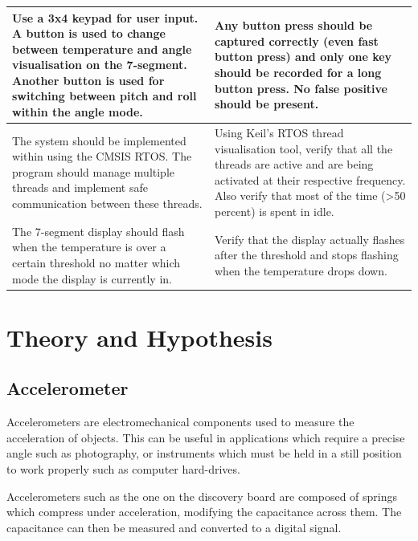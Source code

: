 ﻿\documentclass[12pt]{article}
\begin{document}
\begin{table}[!h]
\begin{tabular}{|p{0.5\linewidth}|p{0.5\linewidth}|}
Use a 3x4 keypad for user input. A button is used to change between temperature and angle visualisation on the 7-segment. Another button is used for switching between pitch and roll within the angle mode.                                  & Any button press should be captured correctly (even fast button press) and only one key should be recorded for a long button press. No false positive should be present.                                                 \\ \hline
The system should be implemented within using the CMSIS RTOS. The program should manage multiple threads and implement safe communication between these threads.                                                                              & Using Keil's RTOS thread visualisation tool, verify that all the threads are active and are being activated at their respective frequency. Also verify that most of the time (\textgreater 50 percent) is spent in idle. \\ \hline
The 7-segment display should flash when the temperature is over a certain threshold no matter which mode the display is currently in.                                                                                                         & Verify that the display actually flashes after the threshold and stops flashing when the temperature drops down.                                                                                                         \\ \hline
\end{tabular}
\end{table}


\section{Theory and Hypothesis}
\subsection{Accelerometer}
Accelerometers are electromechanical components used to measure the acceleration of objects. This can be useful in applications which require a precise angle such as photography, or instruments which must be held in a still position to work properly such as computer hard-drives.

Accelerometers such as the one on the discovery board are composed of springs which compress under acceleration, modifying the capacitance across them. The capacitance can then be measured and converted to a digital signal.
\end{document}
